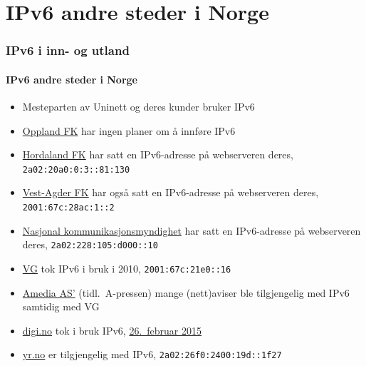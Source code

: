 \section{IPv6 andre steder i Norge}
\begin{frame}%
  \frametitle{IPv6 i inn- og utland}
  \framesubtitle{IPv6 andre steder i Norge}
  \begin{itemize}%
  \item Mesteparten av Uninett og deres kunder bruker IPv6
  \item \href{http://www.oppland.no/}{Oppland FK} har ingen
    planer om å innføre IPv6
  \item \href{http://www.hordaland.no/}{Hordaland FK} har satt en
    IPv6-adresse på webserveren deres, \texttt{2a02:20a0:0:3::81:130}
  \item \href{http://www.vaf.no/}{Vest-Agder FK} har også satt en
    IPv6-adresse på webserveren deres, \texttt{2001:67c:28ac:1::2}
  \item \href{http://www.nkom.no/}{Nasjonal kommunikasjonsmyndighet}
    har satt en IPv6-adresse på webserveren deres,
    \texttt{2a02:228:105:d000::10}
  \item \href{http://vg.no/}{VG} tok IPv6 i bruk i 2010,
    \texttt{2001:67c:21e0::16}
  \item \href{http://www.amedia.no/}{Amedia AS'} (tidl.\ A-pressen) mange
    (nett)aviser ble tilgjengelig med IPv6 samtidig med VG
  \item \href{http://www.digi.no/}{digi.no} tok i bruk IPv6,
    \href{https://twitter.com/digi_no/status/567348983237206016}{26.~februar
      2015}
  \item \href{http://yr.no/}{yr.no} er tilgjengelig med IPv6,
    \texttt{2a02:26f0:2400:19d::1f27}
  \end{itemize}
\end{frame}

